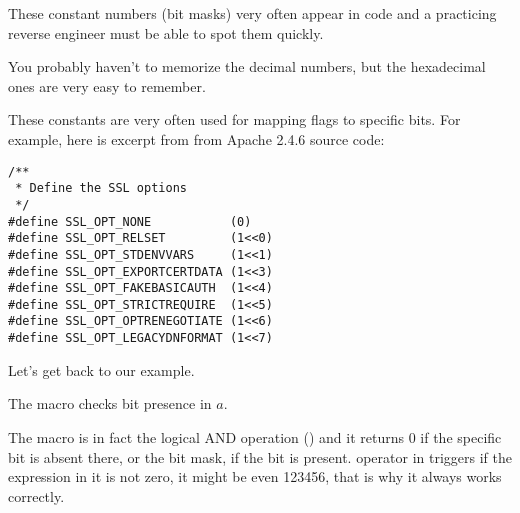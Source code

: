These constant numbers (bit masks) very often appear in code and a practicing reverse engineer 
must be able to spot them quickly.

You probably haven't to memorize the decimal numbers, but the hexadecimal ones are very easy to remember.

These constants are very often used for mapping flags to specific bits.
For example, here is excerpt from  
from Apache 2.4.6 source code:

\begin{lstlisting}
/**
 * Define the SSL options
 */
#define SSL_OPT_NONE           (0)
#define SSL_OPT_RELSET         (1<<0)
#define SSL_OPT_STDENVVARS     (1<<1)
#define SSL_OPT_EXPORTCERTDATA (1<<3)
#define SSL_OPT_FAKEBASICAUTH  (1<<4)
#define SSL_OPT_STRICTREQUIRE  (1<<5)
#define SSL_OPT_OPTRENEGOTIATE (1<<6)
#define SSL_OPT_LEGACYDNFORMAT (1<<7)
\end{lstlisting}

Let's get back to our example.

The  macro checks bit presence in $a$.

The  macro is in fact the logical AND operation () 
and it returns 0 if the specific bit is absent there,
or the bit mask, if the bit is present.
 operator in \CCpp triggers if the expression in it is not zero, it might be even 123456, that is why
it always works correctly.





